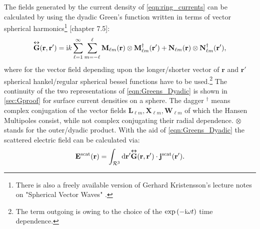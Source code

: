 The fields generated by the current density of \cref{eqn:ring_currents} can be
calculated by using the dyadic Green's function written in terms of vector spherical harmonics\footnote{There is also a freely available version of Gerhard Kristensson's lecture notes on "Spherical Vector Waves" \citep{Kristensson2014}.} \Cite{Kristensson2016}[chapter 7.5]:
\begin{equation}
\overset{\bm\leftrightarrow}{\mathbf{G}}(\mathbf{r},\mathbf{r}') = \mathrm{i} k \sum_{\ell=1}^\infty \sum_{m=-\ell}^\ell
\mathbf{M}_{\ell m}(\mathbf{r})\otimes\mathbf{M}_{\ell m}^\dagger(\mathbf{r}')+
\mathbf{N}_{\ell m}(\mathbf{r})\otimes\mathbf{N}_{\ell m}^\dagger(\mathbf{r}'),
\label{eqn:Greens_Dyadic}
\end{equation}
where for the vector field depending upon the longer/shorter vector of $\mathbf{r}$ and $\mathbf{r}'$ spherical hankel/regular spherical bessel functions have to be used.\footnote{The term outgoing is owing to the choice of the $\exp\left(-\mathrm{i}\omega t\right)$ time dependence.} The continuity of the two representations of \cref{eqn:Greens_Dyadic} is shown in \cref{sec:Gproof} for surface current densities on a sphere.
The dagger $^\dagger$ means complex conjugation of the vector fields $\mathbf{L}_{\ell m},\mathbf{X}_{\ell m},\mathbf{W}_{\ell m}$ of which the Hansen Multipoles consist, while not complex conjugating their radial dependence. $\otimes$ stands for the outer/dyadic product. With the aid of \cref{eqn:Greens_Dyadic} the scattered electric field can be calculated via:
\begin{equation}
\mathbf{E}^\text{scat}(\mathbf{r}) = \int_{\mathcal{R}^3}  \mathrm{d} \mathbf{r}' 
\overset{\bm\leftrightarrow}{\mathbf{G}}(\mathbf{r},\mathbf{r}') \cdot \mathbf{j}^\text{scat}(\mathbf{r}').
\label{eqn:E_scattered}
\end{equation}

